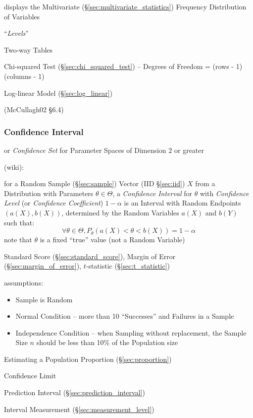 displays the Multivariate (\S\ref{sec:multivariate_statistics}) Frequency
Distribution of Variables

``\emph{Levels}''

Two-way Tables

Chi-squared Test (\S\ref{sec:chi_squared_test}) -- Degrees of Freedom =
(rows - 1)(columns - 1)

Log-linear Model (\S\ref{sec:log_linear})

(McCullagh02 \S 6.4)



\subsubsection{Confidence Interval}\label{sec:confidence_interval}

or \emph{Confidence Set} for Parameter Spaces of Dimension $2$ or greater

(wiki):

for a Random Sample (\S\ref{sec:sample}) Vector (IID \S\ref{sec:iid}) $X$ from a
Distribution with Parameters $\theta \in \Theta$, a \emph{Confidence Interval}
for $\theta$ with \emph{Confidence Level} (or \emph{Confidence Coefficient}) $1
- \alpha$ is an Interval with Random Endpoints $(a(X), b(X))$, determined by the
Random Variables $a(X)$ and $b(Y)$ such that:
\[
  \forall \theta \in \Theta, P_\theta(a(X) < \theta < b(X)) = 1 - \alpha
\]
note that $\theta$ is a fixed ``true'' value (not a Random Variable)

\fist Standard Score (\S\ref{sec:standard_score}), Margin of Error
(\S\ref{sec:margin_of_error}), $t$-statistic (\S\ref{sec:t_statistic})

assumptions:
\begin{itemize}
  \item Sample is Random
  \item Normal Condition -- more than 10 ``Successes'' and Failures in a Sample
  \item Independence Condition -- when Sampling without replacement, the Sample
    Size $n$ should be less than 10\% of the Population size
\end{itemize}

Estimating a Population Proportion (\S\ref{sec:proportion})

Confidence Limit

Prediction Interval (\S\ref{sec:prediction_interval})

Interval Measurement (\S\ref{sec:measurement_level})

